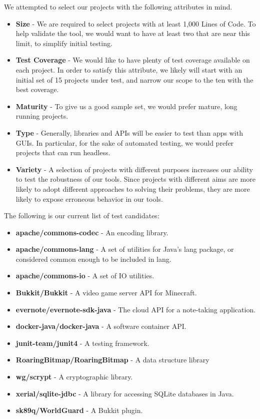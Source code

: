 We attempted to select our projects with the following attributes in mind.

\begin{itemize}
\item \textbf{Size} - We are required to select projects with at least 1,000 Lines of Code. To help validate the tool, we would want to have at least two that are near this limit, to simplify initial testing.
\item \textbf{Test Coverage} - We would like to have plenty of test coverage available on each project. In order to satisfy this attribute, we likely will start with an initial set of 15 projects under test, and narrow our scope to the ten with the best coverage.
\item \textbf{Maturity} - To give us a good sample set, we would prefer mature, long running projects.
\item \textbf{Type} - Generally, libraries and APIs will be easier to test than apps with GUIs. In particular, for the sake of automated testing, we would prefer projects that can run headless.
\item \textbf{Variety} - A selection of projects with different purposes increases our ability to test the robustness of our tools. Since projects with different aims are more likely to adopt different approaches to solving their problems, they are more likely to expose erroneous behavior in our tools.
\end{itemize}

The following is our current list of test candidates:

\begin{itemize}
	\item \textbf{apache/commons-codec} - An encoding library.
    \item \textbf{apache/commons-lang} - A set of utilities for Java's lang package, or considered common enough to be included in lang.
    \item \textbf{apache/commons-io} - A set of IO utilities.
    \item \textbf{Bukkit/Bukkit} - A video game server API for Minecraft.
    \item \textbf{evernote/evernote-sdk-java} - The cloud API for a note-taking application.
    \item \textbf{docker-java/docker-java} - A software container API.
    \item \textbf{junit-team/junit4} - A testing framework.
    \item \textbf{RoaringBitmap/RoaringBitmap} - A data structure library
    \item \textbf{wg/scrypt} - A cryptographic library.
    \item \textbf{xerial/sqlite-jdbc} - A library for accessing SQLite databases in Java.
   \item \textbf{sk89q/WorldGuard} - A Bukkit plugin.
\end{itemize}


